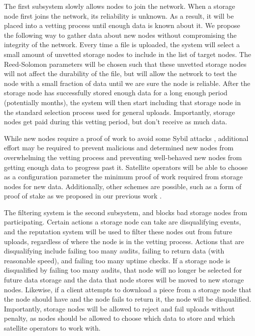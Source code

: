 \documentclass[a4paper,10pt]{article} \usepackage[utf8]{inputenc}
\begin{document}
The first subsystem slowly allows nodes to join the network.
When a storage node first joins the network, its reliability is unknown.
As a result, it will be placed into a vetting
process until enough data is known about it.
We propose the following way to gather data about new nodes
without compromising the integrity of the network.
Every time a file is uploaded, the system will select a small amount of
unvetted storage nodes to include in the list of target nodes.
The Reed-Solomon parameters will be chosen such that these unvetted storage
nodes will not affect the durability of the file, but will allow the network
to test the node
with a small fraction of data until we are sure the node is reliable.
After the storage node has successfully stored enough data for a long enough
period (potentially months),
the system will then start including that storage
node in the standard selection process used for general uploads.
Importantly, storage nodes get paid during this
vetting period, but don't receive as much data.

While new nodes require a proof of work to avoid some Sybil attacks
\cite{sybil-attack}, additional effort may be required to prevent
malicious and determined new nodes from overwhelming the vetting process and
preventing well-behaved new nodes from getting enough data to progress past it.
Satellite operators will be able to choose as a configuration
parameter the minimum proof of work required from storage nodes for new data.
Additionally, other schemes are possible, such as a form of proof of stake as
we proposed in our previous work \cite{sybil-cost}.

The filtering system is the second subsystem, and blocks bad storage nodes from
participating.
Certain actions a storage node can take are disqualifying events, and the
reputation system will be used to filter these nodes out from future uploads,
regardless of where the node is in the vetting process.
Actions that are disqualifying include failing too many audits,
failing to return data (with reasonable speed), and failing too many uptime
checks.
If a storage node is disqualified by failing too many audits, that node will no
longer be selected for future data storage and the data that node stores will
be moved to new storage nodes.
Likewise, if a client attempts to download a piece from a storage node that
the node should have and the node fails to return it, the
node will be disqualified. Importantly, storage nodes will be allowed to reject
and fail uploads without penalty, as nodes should be allowed to choose which
data to store and which satellite operators to work with.
\end{document}
